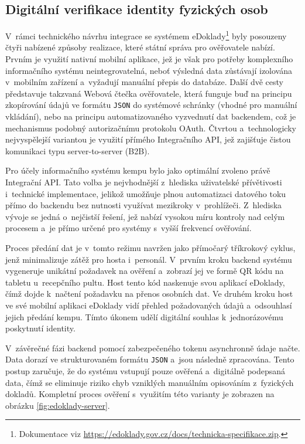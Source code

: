 \subsection{Digitální verifikace identity fyzických osob}
V~rámci technického návrhu integrace se systémem eDoklady\footnote{Dokumentace viz \url{https://edoklady.gov.cz/docs/technicka-specifikace.zip}.} byly posouzeny čtyři nabízené způsoby realizace, které státní správa pro ověřovatele nabízí.
Prvním je využití nativní mobilní aplikace, jež je však pro potřeby komplexního informačního systému neintegrovatelná, neboť výsledná data zůstávají izolována v~mobilním zařízení a~vyžadují manuální přepis do databáze.
Další dvě cesty představuje takzvaná Webová čtečka ověřovatele, která funguje buď na principu zkopírování údajů ve formátu \texttt{JSON} do systémové schránky (vhodné pro manuální vkládání), nebo na principu automatizovaného vyzvednutí dat backendem, což je mechanismus podobný autorizačnímu protokolu OAuth.
Čtvrtou a~technologicky nejvyspělejší variantou je využití přímého Integračního API, jež zajišťuje čistou komunikaci typu server-to-server (B2B).

Pro účely informačního systému kempu bylo jako optimální zvoleno právě Integrační API.
Tato volba je nejvhodnější z~hlediska uživatelské přívětivosti i~technické implementace, jelikož umožňuje plnou automatizaci datového toku přímo do backendu bez nutnosti využívat mezikroky v~prohlížeči.
Z~hlediska vývoje se jedná o~nejčistší řešení, jež nabízí vysokou míru kontroly nad celým procesem a~je přímo určené pro systémy s~vyšší frekvencí ověřování.

Proces předání dat je v~tomto režimu navržen jako přímočarý tříkrokový cyklus, jenž minimalizuje zátěž pro hosta i~personál.
V~prvním kroku backend systému vygeneruje unikátní požadavek na ověření a~zobrazí jej ve formě QR kódu na tabletu u~recepčního pultu.
Host tento kód naskenuje svou aplikací eDoklady, čímž dojde k~načtení požadavku na přenos osobních dat.
Ve druhém kroku host ve své mobilní aplikaci eDoklady vidí přehled požadovaných údajů a~odsouhlasí jejich předání kempu.
Tímto úkonem udělí digitální souhlas k~jednorázovému poskytnutí identity.

V~závěrečné fázi backend pomocí zabezpečeného tokenu asynchronně údaje načte.
Data dorazí ve strukturovaném formátu \texttt{JSON} a~jsou následně zpracována.
Tento postup zaručuje, že do systému vstupují pouze ověřená a~digitálně podepsaná data, čímž se eliminuje riziko chyb vzniklých manuálním opisováním z~fyzických dokladů.
Kompletní proces ověření s~využitím této varianty je zobrazen na obrázku \ref{fig:edoklady-server}.

